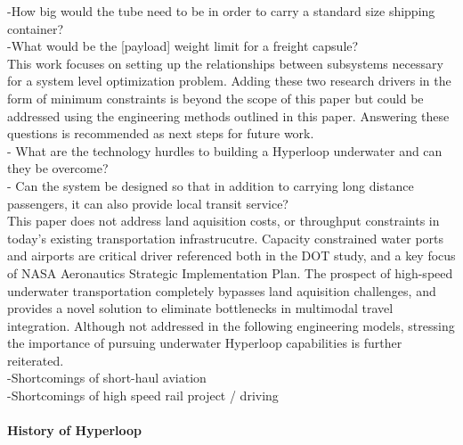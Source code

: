 	-How big would the tube need to be in order to
	carry a standard size shipping container?\\

	-What would be the [payload] weight limit for a freight capsule?\\

	This work focuses on setting up the relationships between subsystems
	necessary for a system level optimization problem. Adding these two research
	drivers in the form of minimum constraints is beyond the scope of this paper
	but could be addressed using the engineering methods outlined in this paper.
	Answering these questions is recommended as next steps for future work.\\

	- What are the technology hurdles to building a Hyperloop underwater and can
	they be overcome?\\

	- Can the system be designed so that in addition to carrying long distance
	passengers, it can also provide local transit service?\\

	This paper does not address land aquisition costs, or throughput
	constraints in today's existing transportation infrastrucutre.
	Capacity constrained water ports and airports are critical driver referenced
	both in the DOT study, and a key focus of NASA Aeronautics Strategic
	Implementation Plan. The prospect of high-speed underwater transportation
	completely bypasses land aquisition challenges, and provides a novel solution
	to eliminate bottlenecks in multimodal travel integration.
	Although not addressed in the following engineering models,
	stressing the importance of pursuing underwater
	Hyperloop capabilities is further reiterated.\\


	-Shortcomings of short-haul aviation\\
	-Shortcomings of high speed rail project / driving\\


\paragraph{History of Hyperloop}

